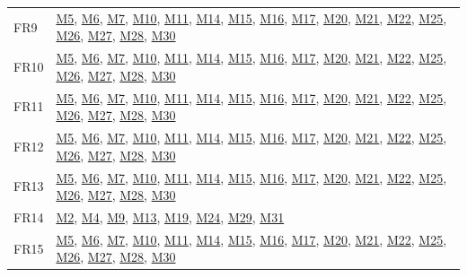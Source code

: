 \documentclass[12pt, titlepage]{article}
\begin{document}
\begin{table}[H]
\begin{tabular}{p{} p{}}
FR9 & \hyperref[m5]{M5}, \hyperref[m6]{M6}, \hyperref[m7]{M7}, \hyperref[m10]{M10}, \hyperref[m11]{M11}, \hyperref[m14]{M14}, \hyperref[m15]{M15}, \hyperref[m16]{M16}, \hyperref[m17]{M17}, \hyperref[m20]{M20}, \hyperref[m21]{M21}, \hyperref[m22]{M22}, \hyperref[m25]{M25}, \hyperref[m26]{M26}, \hyperref[m27]{M27}, \hyperref[m28]{M28}, \hyperref[m30]{M30}\\
FR10 & \hyperref[m5]{M5}, \hyperref[m6]{M6}, \hyperref[m7]{M7}, \hyperref[m10]{M10}, \hyperref[m11]{M11}, \hyperref[m14]{M14}, \hyperref[m15]{M15}, \hyperref[m16]{M16}, \hyperref[m17]{M17}, \hyperref[m20]{M20}, \hyperref[m21]{M21}, \hyperref[m22]{M22}, \hyperref[m25]{M25}, \hyperref[m26]{M26}, \hyperref[m27]{M27}, \hyperref[m28]{M28}, \hyperref[m30]{M30}\\
FR11 & \hyperref[m5]{M5}, \hyperref[m6]{M6}, \hyperref[m7]{M7}, \hyperref[m10]{M10}, \hyperref[m11]{M11}, \hyperref[m14]{M14}, \hyperref[m15]{M15}, \hyperref[m16]{M16}, \hyperref[m17]{M17}, \hyperref[m20]{M20}, \hyperref[m21]{M21}, \hyperref[m22]{M22}, \hyperref[m25]{M25}, \hyperref[m26]{M26}, \hyperref[m27]{M27}, \hyperref[m28]{M28}, \hyperref[m30]{M30}\\
FR12 & \hyperref[m5]{M5}, \hyperref[m6]{M6}, \hyperref[m7]{M7}, \hyperref[m10]{M10}, \hyperref[m11]{M11}, \hyperref[m14]{M14}, \hyperref[m15]{M15}, \hyperref[m16]{M16}, \hyperref[m17]{M17}, \hyperref[m20]{M20}, \hyperref[m21]{M21}, \hyperref[m22]{M22}, \hyperref[m25]{M25}, \hyperref[m26]{M26}, \hyperref[m27]{M27}, \hyperref[m28]{M28}, \hyperref[m30]{M30}\\
FR13 & \hyperref[m5]{M5}, \hyperref[m6]{M6}, \hyperref[m7]{M7}, \hyperref[m10]{M10}, \hyperref[m11]{M11}, \hyperref[m14]{M14}, \hyperref[m15]{M15}, \hyperref[m16]{M16}, \hyperref[m17]{M17}, \hyperref[m20]{M20}, \hyperref[m21]{M21}, \hyperref[m22]{M22}, \hyperref[m25]{M25}, \hyperref[m26]{M26}, \hyperref[m27]{M27}, \hyperref[m28]{M28}, \hyperref[m30]{M30}\\
FR14 & \hyperref[m2]{M2}, \hyperref[m4]{M4}, \hyperref[m9]{M9}, \hyperref[m13]{M13}, \hyperref[m19]{M19}, \hyperref[m24]{M24}, \hyperref[m29]{M29}, \hyperref[m31]{M31}\\
FR15 & \hyperref[m5]{M5}, \hyperref[m6]{M6}, \hyperref[m7]{M7}, \hyperref[m10]{M10}, \hyperref[m11]{M11}, \hyperref[m14]{M14}, \hyperref[m15]{M15}, \hyperref[m16]{M16}, \hyperref[m17]{M17}, \hyperref[m20]{M20}, \hyperref[m21]{M21}, \hyperref[m22]{M22}, \hyperref[m25]{M25}, \hyperref[m26]{M26}, \hyperref[m27]{M27}, \hyperref[m28]{M28}, \hyperref[m30]{M30}\\

\end{tabular}
\end{table}
\end{document}
